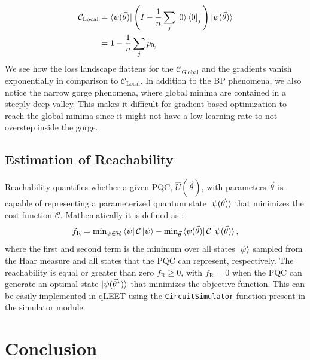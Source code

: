 \documentclass[%
 reprint,
 amsmath,
 amssymb,
 showkeys,
 pra,
 floatfix,
]{revtex4-2}
\begin{document}
\begin{equation}
\begin{split}
    \mathcal{C}_{\text{Local}} &= \bra{\psi(\vec{\theta})} \Bigg(I - \frac{1}{n}\sum_j \ket{0}\bra{0}_j\Bigg) \ket{\psi(\vec{\theta})} \\
    &= 1 - \frac{1}{n}\sum_j p_{0_j}
\end{split}
\end{equation}
We see how the loss landscape flattens for the $\mathcal{C}_{\text{Global}}$ and the gradients vanish exponentially in comparison to  $\mathcal{C}_{\text{Local}}$. In addition to the BP phenomena, we also notice the narrow gorge phenomena, where global minima are contained in a steeply deep valley. This makes it difficult for gradient-based optimization to reach the global minima since it might not have a low learning rate to not overstep inside the gorge. 

\subsection{Estimation of Reachability}

Reachability quantifies whether a given PQC, $\hat{U}(\vec{\theta})$, with parameters $\vec{\theta}$ is capable of representing a parameterized quantum state $\ket{\psi(\vec{\theta})}$ that minimizes the cost function $\mathcal{C}$. Mathematically it is defined as \cite{PhysRevLett.124.090504}:
\begin{equation}
f_\text{R}=\text{min}_{\psi\in\mathcal{H}}\bra{\psi}\mathcal{C}\ket{\psi}-\text{min}_{\vec{\theta}}\bra{\psi(\vec{\theta})}\mathcal{C}\ket{\psi(\vec{\theta})},
\end{equation}
where the first and second term is the minimum over all states $\ket{\psi}$ sampled from the Haar measure and all states that the PQC can represent, respectively. The reachability is equal or greater than zero $f_\text{R}\ge0$, with $f_\text{R}=0$ when the PQC can generate an optimal state $\ket{\psi(\vec{\theta}^*)}$ that minimizes the objective function. This can be easily implemented in qLEET using the \texttt{CircuitSimulator} function present in the simulator module.  

\section{\label{sec:conclusion}Conclusion}
\end{document}

